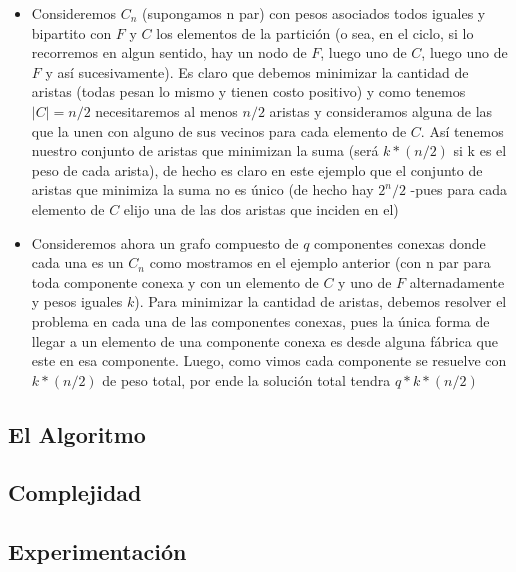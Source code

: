 \documentclass[A4paper,oneside,fleqn,11pt]{article}
\theoremstyle{definition}
\begin{document}
\begin{itemize}
\item Consideremos $C_{n}$ (supongamos n par) con pesos asociados todos iguales y bipartito con $F$ y $C$ los elementos de la partición (o sea, en el ciclo, si lo recorremos en algun sentido, hay un nodo de $F$, luego uno de $C$, luego uno de $F$ y así sucesivamente). Es claro que debemos minimizar la cantidad de aristas (todas pesan lo mismo y tienen costo positivo) y como tenemos $|C|=n/2$ necesitaremos al menos $n/2$ aristas y consideramos alguna de las que la unen con alguno de sus vecinos para cada elemento de $C$. Así tenemos nuestro conjunto de aristas que minimizan la suma (será $k*(n/2)$ si k es el peso de cada arista), de hecho es claro en este ejemplo que el conjunto de aristas que minimiza la suma no es único (de hecho hay $2^n/2$ -pues para cada elemento de $C$ elijo una de las dos aristas que inciden en el)

\item Consideremos ahora un grafo compuesto de $q$ componentes conexas donde cada una es un $C_{n}$ como mostramos en el ejemplo anterior (con n par para toda componente conexa y con un elemento de $C$ y uno de $F$ alternadamente y pesos iguales $k$). Para minimizar la cantidad de aristas, debemos resolver el problema en cada una de las componentes conexas, pues la única forma de llegar a un elemento de una componente conexa es desde alguna fábrica que este en esa componente. Luego, como vimos cada componente se resuelve con $k*(n/2)$ de peso total, por ende la solución total tendra $q*k*(n/2)$
\end{itemize}

\subsection{El Algoritmo}


\subsection{Complejidad}

\subsection{Experimentación}
\end{document}
